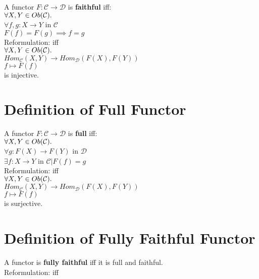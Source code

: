 \documentclass[a4paper, twoside, english, 11pt]{book}
\newcommand{\C}{\mathcal C}
\newcommand{\D}{\mathcal D}
\begin{document}
A functor $F : \C \rightarrow \D$ is \textbf{faithful} iff: \\

$\forall X, Y \in Ob(\C) \ldotp$ \\
\indent
$\forall f, g : X \rightarrow Y$ in $\C$ \\
\indent
$F(f) = F(g) \implies f = g$ \\

\noindent
Reformulation: iff \\

$\forall X, Y \in Ob(\C) \ldotp$ \\
\indent
$Hom_\C(X, Y) \rightarrow Hom_\D(F(X), F(Y))$ \\
\indent
$f \mapsto F(f)$ \\

\noindent
is injective.




\section{Definition of Full Functor}

A functor $F : \C \rightarrow \D$ is \textbf{full} iff: \\

$\forall X, Y \in Ob(\C) \ldotp$ \\
\indent
$\forall g : F(X) \rightarrow F(Y)$ in $\D$ \\
\indent
$\exists f : X \rightarrow Y$ in $\C | F(f) = g$ \\

\noindent
Reformulation: iff \\

$\forall X, Y \in Ob(\C) \ldotp$ \\
\indent
$Hom_\C(X, Y) \rightarrow Hom_\D(F(X), F(Y))$ \\
\indent
$f \mapsto F(f)$ \\

\noindent
is surjective.



\section{Definition of Fully Faithful Functor}

A functor is \textbf{fully faithful} iff it is full and faithful. \\

\noindent
Reformulation: iff \\
\end{document}
